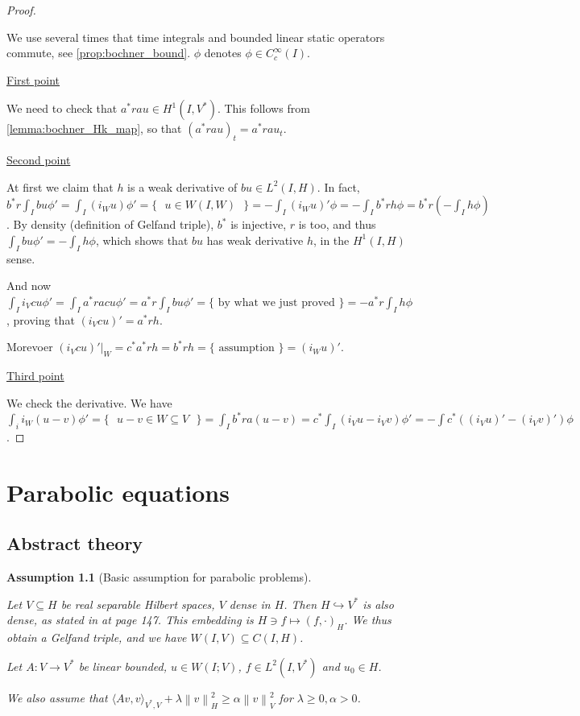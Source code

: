 \documentclass[english,a4paper,12pt,oneside]{scrbook}
\theoremstyle{break}
\newtheorem{ass}[equation]{Assumption}
\newenvironment{mproof}[1][\proofname]{%
  \begin{proof}[#1]$ $\par\nobreak\ignorespaces
}{%
  \end{proof}
}
\renewcommand*{\proofname}{Proof}
\theoremstyle{remark}
\newcommand{\norm}[1]{\left\lVert#1\right\rVert}
\newcommand{\HN}[1]{\norm{#1}_{H}}
\newcommand{\VN}[1]{\norm{#1}_{V}}
\newcommand{\ind}[1]{\{\text{ #1 }\}}
\newcommand{\mind}[1]{$#1$}
\begin{document}
\begin{mproof}

We use several times that time integrals and bounded linear static operators commute, see \cref{prop:bochner_bound}. $\phi$ denotes $\phi \in C^\infty_c(I)$.

\underline{First point}

We need to check that $a^* r a u \in H^1(I, V^*)$. This follows from \cref{lemma:bochner_Hk_map}, so that $(a^* r a u)_t = a^* r a u_t$.

\underline{Second point}

At first we claim that $h$ is a weak derivative of $bu \in L^2(I,H)$. In fact, $b^* r \int_I bu \phi' = \int_I (i_W u)\phi' = \ind{\mind{u \in W(I,W)}} =-\int_I(i_Wu)'\phi=-\int_I b^*r h\phi = b^*r (-\int_I h \phi)$. By density (definition of Gelfand triple), $b^*$ is injective, $r$ is too, and thus $\int_I bu \phi' = -\int_I h \phi$, which shows that $bu$ has weak derivative $h$, in the $H^1(I,H)$ sense.

And now $\int_I i_V c u \phi'= \int_I a^*racu \phi' = a^*r\int_I bu\phi' = \ind{by what we just proved}=-a^*r \int_I h \phi$, proving that $(i_V cu)'=a^*r h$.

Morevoer $(i_V cu)'|_W = c^*a^*r h=b^*rh=\ind{assumption} = (i_W u)'$.

\underline{Third point}

We check the derivative. We have $\int_i i_W(u-v)\phi' =\ind{\mind{u-v \in W\subseteq V}} = \int_I b^* r a (u-v) = c^*\int_I(i_Vu - i_Vv)\phi' = -\int c^*((i_V u)'- (i_V v)')\phi$.

\end{mproof}

\chapter{Parabolic equations}
\label{chap:parab_eq}

\section{Abstract theory}

\begin{ass}[Basic assumption for parabolic problems]
\label{ass:basic_par}

Let $V\subseteq H$ be real separable Hilbert spaces, $V$ dense in $H$. Then $H\hookrightarrow V^*$ is also dense, as stated in \cite{trol} at page 147. This embedding is $H \ni f \mapsto (f, \cdot )_H$. We thus obtain a Gelfand triple, and we have $W(I,V)\subseteq C(I,H)$.

Let $A:V\rightarrow V^* $ be linear bounded, $u \in W(I;V)$, $f \in L^2(I,V^*)$ and $u_0 \in H$.

We also assume that $\langle Av, v \rangle_{V^*,V}+ \lambda \HN{v}^2\geq \alpha \VN{v}^2$ for $\lambda \geq 0, \alpha >0$.
\end{ass}
\end{document}
